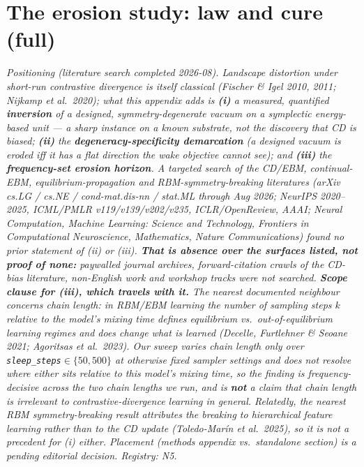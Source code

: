 \documentclass[10pt]{article}
\begin{document}
\section{The erosion study: law and cure (full)}\label{app:erosion}
\emph{Positioning (literature search completed 2026-08). Landscape distortion under short-run contrastive divergence is itself classical (Fischer \& Igel 2010, 2011; Nijkamp et al.\ 2020); what this appendix adds is \textbf{(i)} a measured, quantified \textbf{inversion} of a \emph{designed, symmetry-degenerate} vacuum on a symplectic energy-based unit --- a sharp instance on a known substrate, not the discovery that CD is biased; \textbf{(ii)} the \textbf{degeneracy-specificity demarcation} (a designed vacuum is eroded iff it has a flat direction the wake objective cannot see); and \textbf{(iii)} the \textbf{frequency-set erosion horizon}. A targeted search of the CD/EBM, continual-EBM, equilibrium-propagation and RBM-symmetry-breaking literatures (arXiv cs.LG / cs.NE / cond-mat.dis-nn / stat.ML through Aug 2026; NeurIPS 2020--2025, ICML/PMLR v119/v139/v202/v235, ICLR/OpenReview, AAAI; \emph{Neural Computation}, \emph{Machine Learning: Science and Technology}, \emph{Frontiers in Computational Neuroscience}, \emph{Mathematics}, \emph{Nature Communications}) found no prior statement of (ii) or (iii). \textbf{That is absence over the surfaces listed, not proof of none:} paywalled journal archives, forward-citation crawls of the CD-bias literature, non-English work and workshop tracks were not searched. \textbf{Scope clause for (iii), which travels with it.} The nearest documented neighbour concerns \emph{chain length}: in RBM/EBM learning the number of sampling steps $k$ relative to the model's mixing time defines equilibrium vs.\ out-of-equilibrium learning regimes and does change what is learned (Decelle, Furtlehner \& Seoane 2021; Agoritsas et al.\ 2023). Our sweep varies chain length only over \texttt{sleep\_steps}$\in\{50,500\}$ at otherwise fixed sampler settings and does not resolve where either sits relative to this model's mixing time, so the finding is \emph{frequency-decisive across the two chain lengths we run}, and is \textbf{not} a claim that chain length is irrelevant to contrastive-divergence learning in general. Relatedly, the nearest RBM symmetry-breaking result attributes the breaking to hierarchical feature learning rather than to the CD update (Toledo-Mar\'in et al.\ 2025), so it is not a precedent for (i) either. Placement (methods appendix vs.\ standalone section) is a pending editorial decision. Registry: N5.}
\end{document}
